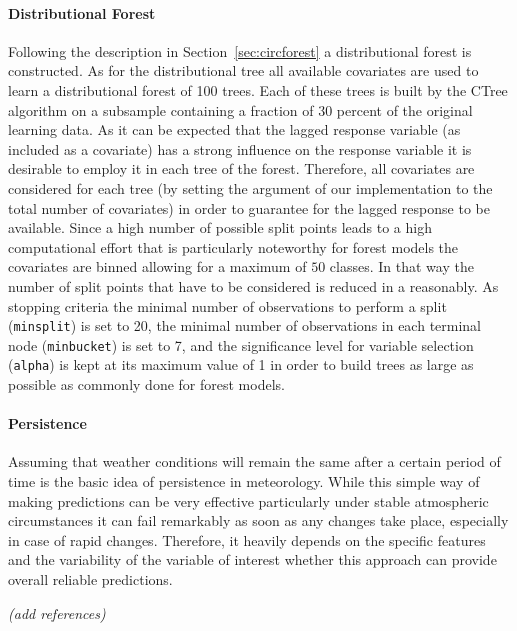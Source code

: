 \documentclass[nojss]{jss}
\newcommand{\fixme}[1]{\emph{\marginpar{FIXME} (#1)}}
\numberwithin{equation}{section}
\begin{document}
\paragraph{Distributional Forest}
Following the description in Section~\ref{sec:circforest} a distributional forest is constructed.
As for the distributional tree all available covariates are used to learn a distributional 
forest of 100 trees. Each of these trees is built by the CTree algorithm on a subsample 
containing a fraction of 30 percent of the original learning data. As it can be expected that 
the lagged response variable (as included as a covariate) has a strong influence on the 
response variable it is desirable to employ it in each tree of the forest. Therefore, all 
covariates are considered for each tree
(by setting the argument  of our implementation to the total number of covariates)
in order to guarantee for the lagged response to be available.
Since a high number of possible split points leads to a high computational effort that is 
particularly noteworthy for forest models the covariates are binned allowing for a maximum of
$50$ classes. In that way the number of split points that have to be considered is reduced
in a reasonably.
As stopping criteria the minimal number of observations to perform a split (\texttt{minsplit}) 
is set to 20, the minimal number of observations in each terminal node (\texttt{minbucket})
is set to 7, and the significance level for variable selection (\texttt{alpha}) is kept at its 
maximum value of 1 in order to build trees as large as possible as commonly done for forest models.


\paragraph{Persistence}
Assuming that weather conditions will remain the same after a certain period of time is the
basic idea of persistence in meteorology. While this simple way of making predictions can
be very effective particularly under stable atmospheric circumstances it can fail remarkably
as soon as any changes take place, especially in case of rapid changes.
Therefore, it heavily depends on the specific features and the variability of the variable
of interest whether this approach can provide overall reliable predictions.

\fixme{add references}
\end{document}
